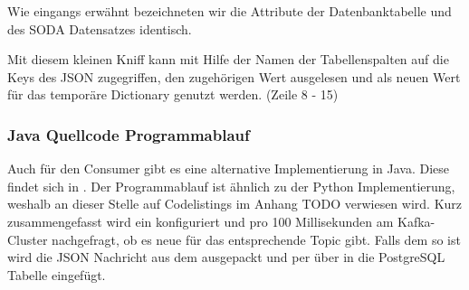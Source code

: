 Wie eingangs erwähnt bezeichneten wir die Attribute der Datenbanktabelle und des \ac{SODA} Datensatzes identisch.

Mit diesem kleinen \glqq Kniff\grqq{} kann mit Hilfe der Namen der Tabellenspalten
auf die Keys des \ac{JSON} zugegriffen, den zugehörigen Wert ausgelesen und als neuen Wert für das temporäre Dictionary genutzt werden.
(Zeile 8 - 15)

\subsubsection{Java Quellcode Programmablauf}
Auch für den Consumer gibt es eine alternative Implementierung in Java.
Diese findet sich in .
Der Programmablauf ist ähnlich zu der Python Implementierung, weshalb an dieser Stelle auf Codelistings im Anhang TODO verwiesen wird.
Kurz zusammengefasst wird ein  konfiguriert und pro 100 Millisekunden am Kafka-Cluster nachgefragt, ob es neue  für das entsprechende Topic gibt.
Falls dem so ist wird die \ac{JSON} Nachricht aus dem  ausgepackt und per  über  in die PostgreSQL Tabelle eingefügt.
